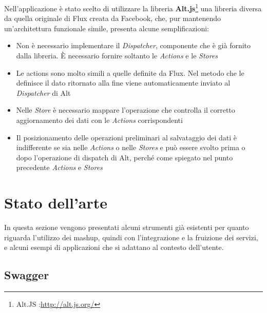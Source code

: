Nell'applicazione è stato scelto di utilizzare la libreria \textbf{Alt.js}\footnote{Alt.JS :\url{http://alt.js.org/}} una libreria diversa da quella originale di Flux creata da Facebook, che, pur mantenendo un'ar\-chi\-tet\-tu\-ra funzionale simile, presenta alcune semplificazioni:
\begin{itemize}
	\item Non è necessario implementare il \emph{Dispatcher}, componente che è già fornito dalla libreria. È necessario fornire soltanto le \emph{Actions}  e le \emph{Stores}
	\item Le actions sono molto simili a quelle definite da Flux. Nel metodo che le definisce il dato ritornato alla fine viene automaticamente inviato al \emph{Dispatcher} di Alt
	\item Nelle \emph{Store} è necessario mappare l'operazione che controlla il corretto aggiornamento dei dati con le \emph{Actions} corrispondenti
	\item Il posizionamento delle operazioni preliminari al salvataggio dei dati è indifferente se sia nelle \emph{Actions} o nelle \emph{Stores} e può essere svolto prima o dopo l'operazione di dispatch di Alt, perché come spiegato nel punto precedente \emph{Actions} e \emph{Stores}
\end{itemize}

\section{Stato dell'arte\label{sec:stato-arte}}

In questa sezione vengono presentati alcuni strumenti già esistenti per quanto riguarda l'utilizzo dei mashup, quindi con l'integrazione e la fruizione dei servizi, e alcuni esempi di applicazioni che si adattano al contesto dell'utente.

\subsection*{Swagger}

